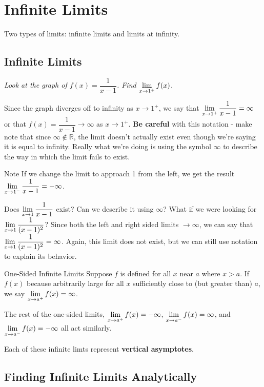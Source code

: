 \section{Infinite Limits}


Two types of limits: infinite limits and limits at infinity.

\subsection*{Infinite Limits}

\textit{Look at the graph of $f(x) = \dfrac{1}{x-1}$. Find $\displaystyle \lim_{x\to1^+} f(x)$.}

Since the graph diverges off to infinity as $x\to1^+$, we say that $\displaystyle \lim_{x\to1^+} \frac{1}{x-1} = \infty$ or that $f(x) = \dfrac{1}{x-1}\to \infty$ as $x\to 1^+$.
\textbf{Be careful} with this notation - make note that since $\infty \notin \mathbb{R}$, the limit doesn't actually exist even though we're saying it is equal to infinity.
Really what we're doing is using the symbol $\infty$ to describe the way in which the limit fails to exist.

\begin{note}{Note}
  If we change the limit to approach 1 from the left, we get the result $\displaystyle \lim_{x\to1^-} \frac{1}{x-1} = -\infty$.

  Does $\displaystyle \lim_{x\to 1} \frac{1}{x-1}$ exist?
  Can we describe it using $\infty$?
  What if we were looking for $\displaystyle \lim_{x\to1} \frac{1}{(x-1)^2}$?
  Since both the left and right sided limits $\to \infty$, we can say that $\displaystyle \lim_{x\to1} \frac{1}{(x-1)^2}=\infty$.
  Again, this limit does not exist, but we can still use notation to explain its behavior.
\end{note}

\begin{defn}{One-Sided Infinite Limits}
  Suppose $f$ is defined for all $x$ near $a$ where $x>a$.
  If $f(x)$ because arbitrarily large for all $x$ sufficiently close to (but greater than) $a$, we say $\displaystyle \lim_{x\to a^+}f(x)=\infty$.

  The rest of the one-sided limits, $\displaystyle \lim_{x\to a^+}f(x)=-\infty$, $\displaystyle \lim_{x\to a^-}f(x)=\infty$, and $\displaystyle \lim_{x\to a^-}f(x)=-\infty$ all act similarly.
\end{defn}

Each of these infinite limts represent \textbf{vertical asymptotes}.

\subsection*{Finding Infinite Limits Analytically}

